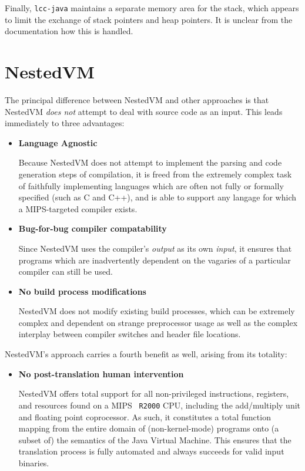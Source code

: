 \documentclass{acmconf}
\begin{document}
Finally, {\tt lcc-java} maintains a separate memory area for the
stack, which appears to limit the exchange of stack pointers and heap
pointers.  It is unclear from the documentation how this is handled.


\section{NestedVM}

The principal difference between NestedVM and other approaches is that
NestedVM {\it does not} attempt to deal with source code as an input.
This leads immediately to three advantages:

\begin{itemize}
\item {\bf Language Agnostic}

      Because NestedVM does not attempt to implement the parsing and
      code generation steps of compilation, it is freed from the
      extremely complex task of faithfully implementing languages
      which are often not fully or formally specified (such as C and
      C++), and is able to support any langage for which a
      MIPS-targeted compiler exists.

\item {\bf Bug-for-bug compiler compatability}

      Since NestedVM uses the compiler's {\it output} as its own {\it
      input}, it ensures that programs which are inadvertently
      dependent on the vagaries of a particular compiler can still be
      used.

\item {\bf No build process modifications}

      NestedVM does not modify existing build processes, which can be
      extremely complex and dependent on strange preprocessor usage as
      well as the complex interplay between compiler switches and
      header file locations.

\end{itemize}

NestedVM's approach carries a fourth benefit as well, arising from its
totality:

\begin{itemize}
\item {\bf No post-translation human intervention}

      NestedVM offers total support for all non-privileged
      instructions, registers, and resources found on a MIPS {\tt
      R2000} CPU, including the add/multiply unit and floating point
      coprocessor.  As such, it constitutes a total function mapping
      from the entire domain of (non-kernel-mode) programs onto (a
      subset of) the semantics of the Java Virtual Machine.  This
      ensures that the translation process is fully automated and
      always succeeds for valid input binaries.
\end{itemize}
\end{document}
